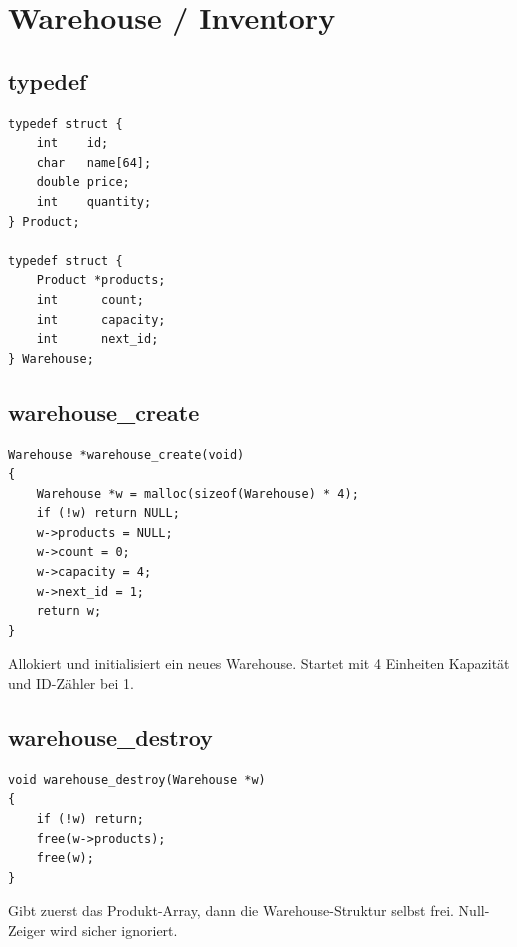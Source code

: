\documentclass[10pt, a4paper]{article}
\begin{document}
\newpage
\section{Warehouse / Inventory}

\subsection{typedef}
\begin{lstlisting}
typedef struct {
    int    id;
    char   name[64];
    double price;
    int    quantity;
} Product;

typedef struct {
    Product *products;
    int      count;
    int      capacity;
    int      next_id;
} Warehouse;
\end{lstlisting}

\subsection{warehouse\_create}
\begin{lstlisting}
Warehouse *warehouse_create(void)
{
    Warehouse *w = malloc(sizeof(Warehouse) * 4);
    if (!w) return NULL;
    w->products = NULL;
    w->count = 0;
    w->capacity = 4;
    w->next_id = 1;
    return w;
}
\end{lstlisting}
Allokiert und initialisiert ein neues Warehouse. Startet mit 4 Einheiten Kapazit\"at und ID-Z\"ahler bei 1.

\subsection{warehouse\_destroy}
\begin{lstlisting}
void warehouse_destroy(Warehouse *w)
{
    if (!w) return;
    free(w->products);
    free(w);
}
\end{lstlisting}
Gibt zuerst das Produkt-Array, dann die Warehouse-Struktur selbst frei. Null-Zeiger wird sicher ignoriert.
\end{document}
